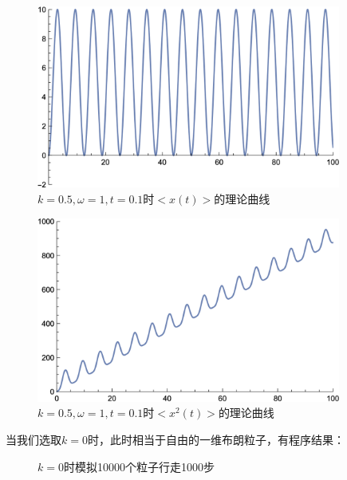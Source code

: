 \documentclass[a4paper,11pt]{article}
\begin{document}
\begin{figure}[!htbp]   
\centering
\includegraphics[width=10cm] {x.png}
\caption{$k=0.5,\omega=1,t=0.1$时$<x(t)>$的理论曲线}      
\end{figure}

\begin{figure}[!htbp]   
\centering
\includegraphics[width=10cm] {x2.png}
\caption{$k=0.5,\omega=1,t=0.1$时$<x^{2}(t)>$的理论曲线}      
\end{figure}


\newpage 当我们选取$k=0$时，此时相当于自由的一维布朗粒子，有程序结果：


	

\begin{figure}[!htbp]   
\centering     
{}
\caption{$k=0$时模拟10000个粒子行走1000步}      
\end{figure}
\end{document}
